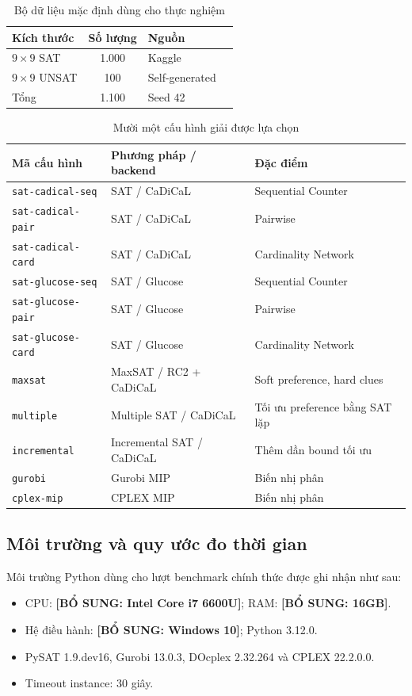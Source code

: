 \documentclass[a4paper,fleqn]{cas-sc}
\newcommand{\noteedit}[1]{\textbf{[BỔ SUNG: #1]}}
\begin{document}
\begin{table}[htbp]
\centering
\caption{Bộ dữ liệu mặc định dùng cho thực nghiệm}
\label{tab:dataset}
\begin{tabularx}{\linewidth}{@{}lclX@{}}
\toprule
Kích thước & Số lượng & Nguồn \\
\midrule
$9\times9$ SAT & 1.000 & Kaggle\\
$9\times9$ UNSAT & 100 & Self-generated \\
\midrule
Tổng & 1.100 & Seed 42 \\
\bottomrule
\end{tabularx}
\end{table}


\begin{table}[htbp]
\centering
\caption{Mười một cấu hình giải được lựa chọn}
\label{tab:configs}
\small
\begin{tabularx}{\linewidth}{@{}lXl@{}}
\toprule
Mã cấu hình & Phương pháp / backend & Đặc điểm\\
\midrule
\texttt{sat-cadical-seq} & SAT / CaDiCaL & Sequential Counter\\
\texttt{sat-cadical-pair} & SAT / CaDiCaL & Pairwise\\
\texttt{sat-cadical-card} & SAT / CaDiCaL & Cardinality Network\\
\texttt{sat-glucose-seq} & SAT / Glucose & Sequential Counter\\
\texttt{sat-glucose-pair} & SAT / Glucose & Pairwise\\
\texttt{sat-glucose-card} & SAT / Glucose & Cardinality Network\\
\texttt{maxsat} & MaxSAT / RC2 + CaDiCaL & Soft preference, hard clues\\
\texttt{multiple} & Multiple SAT / CaDiCaL & Tối ưu preference bằng SAT lặp\\
\texttt{incremental} & Incremental SAT / CaDiCaL & Thêm dần bound tối ưu\\
\texttt{gurobi} & Gurobi MIP & Biến nhị phân\\
\texttt{cplex-mip} & CPLEX MIP & Biến nhị phân\\
\bottomrule
\end{tabularx}
\end{table}


\subsection{Môi trường và quy ước đo thời gian}
Môi trường Python dùng cho lượt benchmark chính thức được ghi nhận như sau:
\begin{itemize}
 \item CPU: \noteedit{Intel Core i7 6600U}; RAM: \noteedit{16GB}.
 \item Hệ điều hành: \noteedit{Windows 10}; Python 3.12.0.
 \item PySAT 1.9.dev16, Gurobi 13.0.3, DOcplex 2.32.264 và CPLEX 22.2.0.0.
 \item Timeout instance: 30 giây.
\end{itemize}
\end{document}
